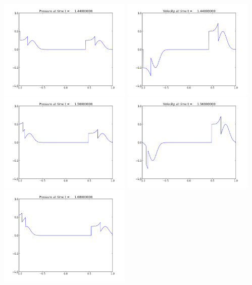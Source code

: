 \documentclass[11pt]{article}
\begin{document}
\vskip 10pt 
\includegraphics[width=0.475\textwidth]{frame0012fig1.png}
\includegraphics[width=0.475\textwidth]{frame0012fig2.png}
\vskip 10pt 
\includegraphics[width=0.475\textwidth]{frame0013fig1.png}
\includegraphics[width=0.475\textwidth]{frame0013fig2.png}
\vskip 10pt 
\includegraphics[width=0.475\textwidth]{frame0014fig1.png}
\end{document}
